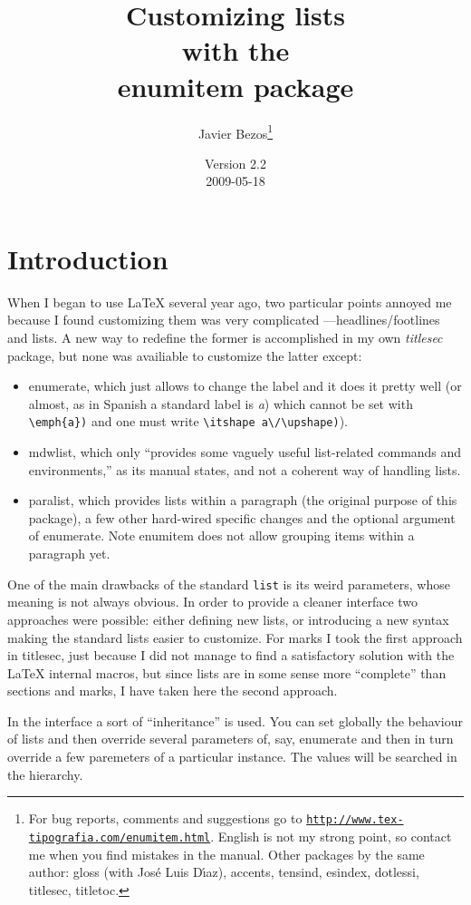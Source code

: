 \documentclass{article}
\title{Customizing lists\\with the\\\textsf{enumitem} package}
\author{Javier Bezos\footnote{For bug reports, comments and
suggestions go to \href{http://www.tex-tipografia.com/enumitem.html}%
{\texttt{http://www.tex-tipografia.com/enumitem.html}}.
English is not my strong point, so contact me when you
find mistakes in the manual. Other packages by the same author:
\textsf{gloss} (with Jos\'e Luis D\'{\i}az), \textsf{accents,
tensind, esindex, dotlessi, titlesec, titletoc}.}}
\date{Version 2.2\\2009-05-18}
\begin{document}
\maketitle

\section{Introduction}

When I began to use \LaTeX{} several year ago, two particular points
annoyed me because I found customizing them was very complicated
---headlines/footlines and lists.  A new way to redefine the former is
accomplished in my own \textit{titlesec} package, but none was
availiable to customize the latter except:
\begin{itemize}
\item \textsf{enumerate}, which just allows to change the label and
it does it pretty well (or almost, as in Spanish a standard label is
\textit{a}) which cannot be set with \verb|\emph{a})| and one must
write \verb|\itshape a\/\upshape)|).

\item \textsf{mdwlist}, which only ``provides some vaguely useful
list-related commands and environments,'' as its manual states,
and not a coherent way of handling lists.

\item \textsf{paralist}, which provides lists within a paragraph (the
original purpose of this package), a few other hard-wired
specific changes and the optional argument of \textsf{enumerate}.
Note \textsf{enumitem} does not allow grouping items within
a paragraph yet.
\end{itemize}

One of the main drawbacks of the standard \verb|list| is its weird
parameters, whose meaning is not always obvious.  In order to provide
a cleaner interface two approaches were possible: either defining new
lists, or introducing a new syntax making the standard lists easier to
customize.  For marks I took the first approach in titlesec, just
because I did not manage to find a satisfactory solution with the
\LaTeX{} internal macros, but since lists are in some sense more
``complete'' than sections and marks, I have taken here the second
approach.

In the interface a sort of ``inheritance'' is used. You can
set globally the behaviour of lists and then override several
parameters of, say, enumerate and then in turn override
a few paremeters of a particular instance. The values will
be searched in the hierarchy.
\end{document}
